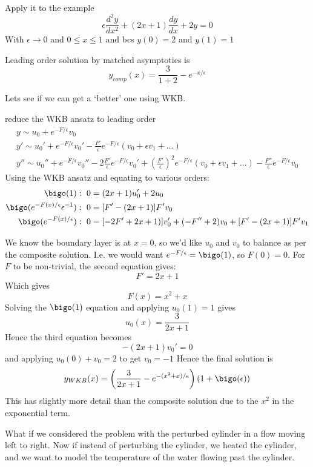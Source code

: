 \documentclass{X:/Documents/Coding/Latex/myassignment}
\begin{document}
Apply it to the example
\[\epsilon \frac{d^2y}{dx^2} + (2x+1) \frac{dy}{dx} + 2y = 0\]
With $\epsilon\to 0$ and $0\leq x \leq 1$ and bcs $y(0)=2$ and $y(1)=1$

Leading order solution by matched asymptotics is 
\[y_{comp}(x) = \frac{3}{1+2} - e^{-x/\epsilon}\]

Lets see if we can get a `better' one using WKB.

reduce the WKB ansatz to leading order
\begin{align*}
    y \sim u_0 + e^{-F/\epsilon} v_0\\
    y' \sim u_0' + e^{-F/\epsilon} v_0' -\frac{F'}{\epsilon} e^{-F/\epsilon} (v_0 + \epsilon v_1 +\hdots)\\
    y'' \sim u_0'' + e^{-F/\epsilon} v_0'' - 2\frac{F'}{\epsilon}e^{-F/\epsilon} v_0'+ \left(\frac{F'}{\epsilon}\right)^2 e^{-F/\epsilon}(v_0 + \epsilon v_1 + \hdots) - \frac{F''}{\epsilon} e^{-F/\epsilon} v_0
\end{align*}
Using the WKB ansatz and equating to various orders:
\begin{align*}
    \bigo(1): \ 0&= (2x +1) u_0' + 2u_0\\
    \bigo(e^{-F(x)/\epsilon}\epsilon^{-1}): \ 0 &= [F' - (2x+1)]F'v_0\\
    \bigo(e^{-F(x)/\epsilon}): \ 0 &= [-2F' +2 x +1)]v_0' + (-F'' + 2)v_0 +[F' - (2x+ 1)] F'v_1\\
\end{align*}

We know the boundary layer is at $x=0$, so we'd like $u_0$ and $v_0$ to balance as per the composite solution. I.e. we would want $e^{-F/\epsilon} = \bigo(1)$, so $F(0) = 0$. For $F$ to be non-trivial, the second equation gives:
\[F' = 2x+1\]
Which gives
\[F(x) = x^2 +x\]
Solving the $\bigo(1)$ equation and applying $u_0(1) = 1$ gives
\[u_0(x) = \frac{3}{2x+1}\]
Hence the third equation becomes 
\[-(2x +1)v_0' = 0\]
and applying $u_0(0) + v_0 = 2$ to get $v_0 = -1$
Hence the final solution is
\[y_{WKB}(x) = \left(\frac{3}{2x+1} - e^{-(x^2+x)/\epsilon}\right) (1+\bigo(\epsilon))\]
This has slightly more detail than the composite solution due to the $x^2$ in the exponential term.




What if we considered the problem with the perturbed cylinder in a flow moving left to right.
Now if instead of perturbing the cylinder, we heated the cylinder, and we want to model the temperature of the water flowing past the cylinder. 
\end{document}
